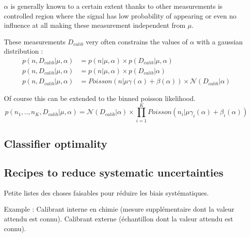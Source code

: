 $\alpha$ is generally known to a certain extent thanks to other measurements is controlled region where the signal has low probability of appearing or even no influence at all making these measurement independent from $\mu$.

These measurements $D_{calib}$ very often constrains the values of $\alpha$ with a gaussian distribution :
\begin{align}
	p(n, D_{calib} | \mu, \alpha) &= p(n | \mu, \alpha) \times p(D_{calib} | \mu, \alpha) \\
	p(n, D_{calib} | \mu, \alpha) &= p(n | \mu, \alpha) \times p(D_{calib} | \alpha) \\
	p(n, D_{calib} | \mu, \alpha) &= Poisson(n | \mu \gamma(\alpha) +\beta(\alpha)) \times \mathcal N(D_{calib} | \alpha)
\end{align}

Of course this can be extended to the binned poisson likelihood.
\begin{equation}
	p(n_1, .., n_K, D_{calib} | \mu, \alpha) = \mathcal N(D_{calib} | \alpha) \times \prod_{i=1}^K Poisson(n_i | \mu \gamma_i(\alpha) +\beta_i(\alpha))
\end{equation}





\subsection{Classifier optimality} %
\label{sub:classifier_optimality}









\subsection{Recipes to reduce systematic uncertainties} %
\label{sub:recipes_to_reduce_systematic_unceratinties}


Petite listes des choses faisables pour réduire les biais systématiques. 


Example : Calibrant interne en chimie (mesure supplémentaire dont la valeur attendu est connu). Calibrant externe (échantillon dont la valeur attendu est connu).








